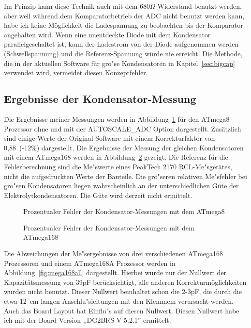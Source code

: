 Im Prinzip kann diese Technik auch mit dem \(680\Omega\) Widerstand benutzt werden,
aber weil w\"ahrend dem Komparatorbetrieb der ADC nicht benutzt werden kann, habe ich keine
M\"oglichkeit die Ladespannung zu beobachten bis der Komparator angehalten wird.
Wenn eine unentdeckte Diode mit dem Kondensator parallelgeschaltet ist, kann der Ladestrom
von der Diode aufgenommen werden (Schwellspannung) und die Referenz-Spannung w\"urde nie erreicht.
Die Methode, die in der aktuellen Software f\"ur gro"se Kondensatoren in Kapitel~\ref{sec:bigcap}
verwendet wird, vermeidet diesen Konzeptfehler.

\subsection{Ergebnisse der Kondensator-Messung}
Die Ergebnisse meiner Messungen werden in Abbildung~\ref{fig:mega8cap} f\"ur den ATmega8 Prozessor ohne und mit
der AUTOSCALE\_ADC Option dargestellt. Zus\"atzlich sind einige Werte der Original-Software mit einem Korrekturfaktor
von 0,88~(-12\%) dargestellt.
Die Ergebnisse der Messung der gleichen Kondensatoren mit einem ATmega168 werden in Abbildung~\ref{fig:mega168cap} gezeigt.
Die Referenz f\"ur die Fehlerberechnung sind die Me"swerte eines PeakTech 2170 RCL-Me"sger\"ates, 
 nicht die aufgedruckten Werte der Bauteile.
Die gr\"o"seren relativen Me"sfehler bei gro"sen Kondensatoren liegen wahrscheinlich an der unterschiedlichen G\"ute 
der Elektrolytkondensatoren. Die G\"ute wird derzeit nicht ermittelt.

\begin{figure}[H]
\centering

\caption{Prozentualer Fehler der Kondensator-Messungen mit dem ATmega8}
\label{fig:mega8cap}
\end{figure}

\begin{figure}[H]
\centering

\caption{Prozentualer Fehler der Kondensator-Messungen mit dem ATmega168}
\label{fig:mega168cap}
\end{figure}

Die Abweichungen der Me"sergebnisse von drei verschiedenen ATmega168 Prozessoren und einem ATmega168A Prozessor werden in Abbildung~\ref{fig:mega168all} dargestellt.
Hierbei wurde nur der Nullwert der Kapazit\"atsmessung von 39pF ber\"ucksichtigt, alle anderen Korrekturm\"oglichkeiten wurden
nicht benutzt. Dieser Nullwert beinhaltet schon die 2-3pF, die durch die etwa 12~cm langen Anschlu"sleitungen mit den
Klemmem verursacht werden.
Auch das Board Layout hat Einflu"s auf diesen Nullwert. Diesen Nullwert habe ich mit der Board Version ,,DG2BRS V 5.2.1'' ermittelt.

